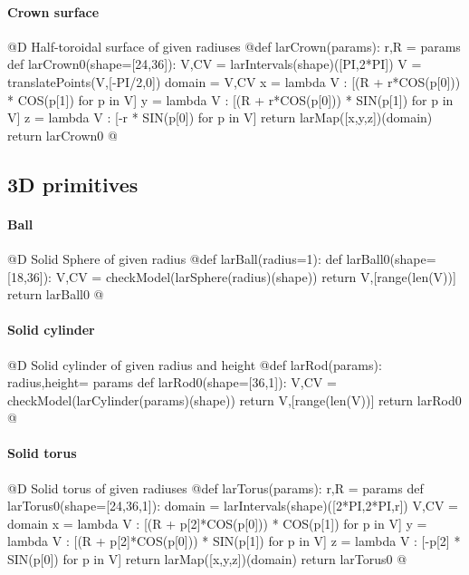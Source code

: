 \documentclass[11pt,oneside]{article}	%
\begin{document}
\paragraph{Crown surface}
@D Half-toroidal surface of given radiuses
@{def larCrown(params):
	r,R = params
	def larCrown0(shape=[24,36]):
		V,CV = larIntervals(shape)([PI,2*PI])
		V = translatePoints(V,[-PI/2,0])
		domain = V,CV
		x = lambda V : [(R + r*COS(p[0])) * COS(p[1]) for p in V]
		y = lambda V : [(R + r*COS(p[0])) * SIN(p[1]) for p in V]
		z = lambda V : [-r * SIN(p[0]) for p in V]
		return larMap([x,y,z])(domain)
	return larCrown0
@}

\subsection{3D primitives}

\paragraph{Ball}
@D Solid Sphere of given radius
@{def larBall(radius=1):
	def larBall0(shape=[18,36]):
		V,CV = checkModel(larSphere(radius)(shape))
		return V,[range(len(V))]
	return larBall0
@}

\paragraph{Solid cylinder}
@D Solid cylinder of given radius and height
@{def larRod(params):
	radius,height= params
	def larRod0(shape=[36,1]):
		V,CV = checkModel(larCylinder(params)(shape))
		return V,[range(len(V))]
	return larRod0
@}

\paragraph{Solid torus}
@D Solid torus of given radiuses
@{def larTorus(params):
	r,R = params
	def larTorus0(shape=[24,36,1]):
		domain = larIntervals(shape)([2*PI,2*PI,r])
		V,CV = domain
		x = lambda V : [(R + p[2]*COS(p[0])) * COS(p[1]) for p in V]
		y = lambda V : [(R + p[2]*COS(p[0])) * SIN(p[1]) for p in V]
		z = lambda V : [-p[2] * SIN(p[0]) for p in V]
		return larMap([x,y,z])(domain)
	return larTorus0
@}
\end{document}
